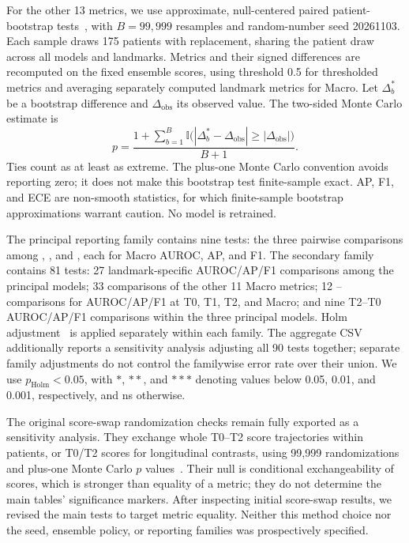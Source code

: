 For the other 13 metrics, we use approximate, null-centered paired patient-bootstrap tests~\citep{davison1997}, with $B=99{,}999$ resamples and random-number seed 20261103. Each sample draws 175 patients with replacement, sharing the patient draw across all models and landmarks. Metrics and their signed differences are recomputed on the fixed ensemble scores, using threshold 0.5 for thresholded metrics and averaging separately computed landmark metrics for Macro. Let $\Delta_b^*$ be a bootstrap difference and $\Delta_{\mathrm{obs}}$ its observed value. The two-sided Monte Carlo estimate is
\begin{equation}
 p=\frac{1+\sum_{b=1}^{B}\mathbb{I}\bigl(|\Delta_b^*-\Delta_{\mathrm{obs}}|\geq|\Delta_{\mathrm{obs}}|\bigr)}{B+1}.
\end{equation}
Ties count as at least as extreme. The plus-one Monte Carlo convention avoids reporting zero; it does not make this bootstrap test finite-sample exact. AP, F1, and ECE are non-smooth statistics, for which finite-sample bootstrap approximations warrant caution. No model is retrained.

The principal reporting family contains nine tests: the three pairwise comparisons among \nojepa{}, \direct{}, and \fullmodel{}, each for Macro AUROC, AP, and F1. The secondary family contains 81 tests: 27 landmark-specific AUROC/AP/F1 comparisons among the principal models; 33 comparisons of the other 11 Macro metrics; 12 \fullmodel{}--\meanmodel{} comparisons for AUROC/AP/F1 at T0, T1, T2, and Macro; and nine T2--T0 AUROC/AP/F1 comparisons within the three principal models. Holm adjustment~\citep{holm1979} is applied separately within each family. The aggregate CSV additionally reports a sensitivity analysis adjusting all 90 tests together; separate family adjustments do not control the familywise error rate over their union. We use $p_{\mathrm{Holm}}<0.05$, with $*$, $**$, and $***$ denoting values below 0.05, 0.01, and 0.001, respectively, and ns otherwise.

The original score-swap randomization checks remain fully exported as a sensitivity analysis. They exchange whole T0--T2 score trajectories within patients, or T0/T2 scores for longitudinal contrasts, using 99,999 randomizations and plus-one Monte Carlo $p$ values~\citep{phipson2010}. Their null is conditional exchangeability of scores, which is stronger than equality of a metric; they do not determine the main tables' significance markers. After inspecting initial score-swap results, we revised the main tests to target metric equality. Neither this method choice nor the seed, ensemble policy, or reporting families was prospectively specified.

